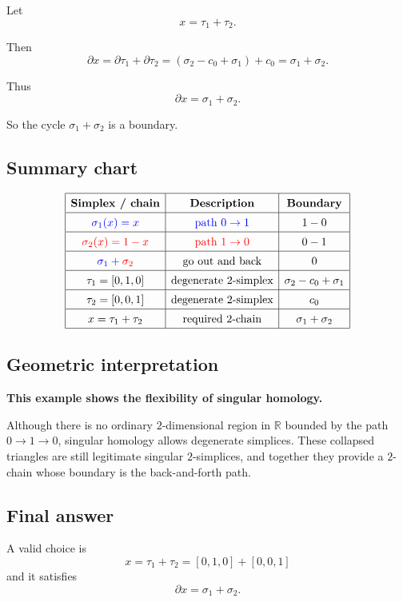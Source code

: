\documentclass[12pt,a4paper]{article}
\theoremstyle{notespace}
\begin{document}
Let
\[
x=\tau_1+\tau_2.
\]

Then
\[
\partial x
=
\partial\tau_1+\partial\tau_2
=
(\sigma_2-c_0+\sigma_1)+c_0
=
\sigma_1+\sigma_2.
\]

Thus
\[
\boxed{\partial x=\sigma_1+\sigma_2.}
\]

So the cycle \(\sigma_1+\sigma_2\) is a boundary.

\subsection{Summary chart}

\[
\renewcommand{\arraystretch}{1.4}
\begin{array}{|c|c|c|}
	\hline
	\textbf{Simplex / chain} & \textbf{Description} & \textbf{Boundary} \\
	\hline
	\color{blue}{\sigma_1(x)=x} & \color{blue}{\text{path }0\to1} & 1-0 \\
	\hline
	\color{red}{\sigma_2(x)=1-x} & \color{red}{\text{path }1\to0} & 0-1 \\
	\hline
	\color{blue}{\sigma_1}+\color{red}{\sigma_2} & \text{go out and back} & 0 \\
	\hline
	\tau_1=[0,1,0] & \text{degenerate }2\text{-simplex} & \sigma_2-c_0+\sigma_1 \\
	\hline
	\tau_2=[0,0,1] & \text{degenerate }2\text{-simplex} & c_0 \\
	\hline
	x=\tau_1+\tau_2 & \text{required }2\text{-chain} & \sigma_1+\sigma_2 \\
	\hline
\end{array}
\]

\subsection{Geometric interpretation}

\textbf{This example shows the flexibility of singular homology.}

Although there is no ordinary \(2\)-dimensional region in \(\mathbb{R}\) bounded by the path \(0\to1\to0\), singular homology allows degenerate simplices. These collapsed triangles are still legitimate singular \(2\)-simplices, and together they provide a \(2\)-chain whose boundary is the back-and-forth path.

\subsection{Final answer}

A valid choice is
\[
\boxed{x=\tau_1+\tau_2=[0,1,0]+[0,0,1]}
\]
and it satisfies
\[
\boxed{\partial x=\sigma_1+\sigma_2.}
\]
\end{document}
